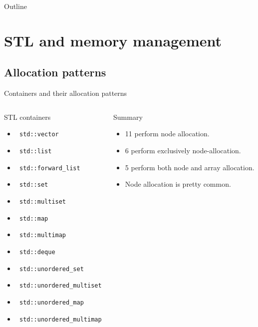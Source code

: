 \documentclass[10pt,aspectratio=169]{beamer}
\begin{document}
\begin{frame}{Outline}
   \tableofcontents
\end{frame}

\section{STL and memory management}
\subsection{Allocation patterns}

\begin{frame}{Containers and their allocation patterns}
\begin{columns}
\begin{column}[c]{0.45\textwidth}
\begin{block} {STL containers}
\begin{itemize}
\item \texttt{\color{green!50!black} std::vector}
\item \texttt{\color{red!50!black} std::list}
\item \texttt{\color{red!50!black} std::forward\_list}
\item \texttt{\color{red!50!black} std::set}
\item \texttt{\color{red!50!black} std::multiset}
\item \texttt{\color{red!50!black} std::map}
\item \texttt{\color{red!50!black} std::multimap}
\item \texttt{\color{brown!50!black} std::deque}
\item \texttt{\color{brown!50!black} std::unordered\_set}
\item \texttt{\color{brown!50!black} std::unordered\_multiset}
\item \texttt{\color{brown!50!black} std::unordered\_map}
\item \texttt{\color{brown!50!black} std::unordered\_multimap}
\end{itemize}
\end{block}
\end{column}

\begin{column}[c]{0.45\textwidth}
\begin{block} {Summary}
\begin{itemize}
\item 11 perform node allocation.
\item 6 perform exclusively node-allocation.
\item 5 perform both node and array allocation.
\item Node allocation is pretty common.
\end{itemize}
\end{block}

\end{column}
\end{columns}
\end{frame}
\end{document}
